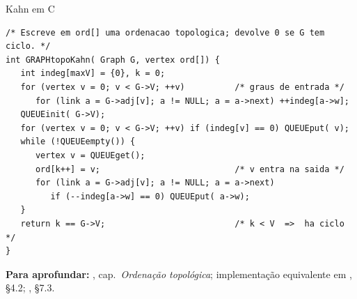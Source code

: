 \documentclass[aspectratio=169]{beamer}
\newcommand{\fonte}[1]{%
  \vfill
  {\tiny\color{gray!55!black}\textbf{Para aprofundar:} #1\par}%
}
\begin{document}
\begin{frame}[fragile]{Kahn em C}
\begin{lstlisting}
/* Escreve em ord[] uma ordenacao topologica; devolve 0 se G tem ciclo. */
int GRAPHtopoKahn( Graph G, vertex ord[]) {
   int indeg[maxV] = {0}, k = 0;
   for (vertex v = 0; v < G->V; ++v)          /* graus de entrada */
      for (link a = G->adj[v]; a != NULL; a = a->next) ++indeg[a->w];
   QUEUEinit( G->V);
   for (vertex v = 0; v < G->V; ++v) if (indeg[v] == 0) QUEUEput( v);
   while (!QUEUEempty()) {
      vertex v = QUEUEget();
      ord[k++] = v;                           /* v entra na saida */
      for (link a = G->adj[v]; a != NULL; a = a->next)
         if (--indeg[a->w] == 0) QUEUEput( a->w);
   }
   return k == G->V;                          /* k < V  =>  ha ciclo */
}
\end{lstlisting}
  \fonte{\cite{feofiloff2020algoritmos}, cap.\ \emph{Ordenação topológica}; implementação equivalente em
  \cite{sedgewick2011algorithms}, §4.2; \cite{ziviani2011projeto}, §7.3.}
\end{frame}
\end{document}
